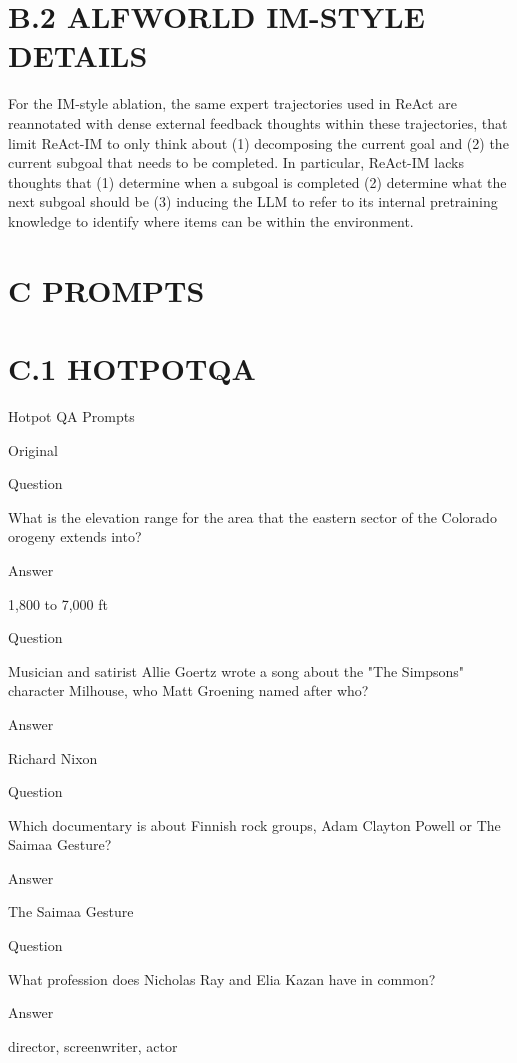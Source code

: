 \documentclass[
]{article}
\begin{document}
\section{B.2 ALFWORLD IM-STYLE
DETAILS}\label{b.2-alfworld-im-style-details}

For the IM-style ablation, the same expert trajectories used in ReAct
are reannotated with dense external feedback thoughts within these
trajectories, that limit ReAct-IM to only think about (1) decomposing
the current goal and (2) the current subgoal that needs to be completed.
In particular, ReAct-IM lacks thoughts that (1) determine when a subgoal
is completed (2) determine what the next subgoal should be (3) inducing
the LLM to refer to its internal pretraining knowledge to identify where
items can be within the environment.

\section{C PROMPTS}\label{c-prompts}

\section{C.1 HOTPOTQA}\label{c.1-hotpotqa}

Hotpot QA Prompts

Original

Question

What is the elevation range for the area that the eastern sector of the
Colorado orogeny extends into?

Answer

1,800 to 7,000 ft

Question

Musician and satirist Allie Goertz wrote a song about the "The Simpsons"
character Milhouse, who Matt Groening named after who?

Answer

Richard Nixon

Question

Which documentary is about Finnish rock groups, Adam Clayton Powell or
The Saimaa Gesture?

Answer

The Saimaa Gesture

Question

What profession does Nicholas Ray and Elia Kazan have in common?

Answer

director, screenwriter, actor
\end{document}
